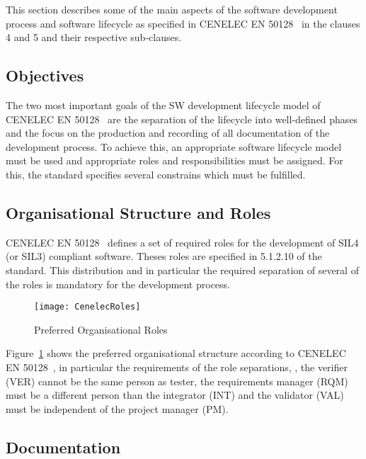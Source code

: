 
This section describes some of the main aspects of the software development
process and software lifecycle as specified in CENELEC EN 50128~\cite{EN-50128}
in the clauses 4 and 5 and their respective sub-clauses.

\subsection{Objectives}
\label{sec:objectives}

The two most important goals of the SW development lifecycle model of CENELEC EN
50128~\cite{EN-50128} are the separation of the lifecycle into well-defined
phases and the focus on the production and recording of all documentation of the
development process. To achieve this, an appropriate software lifecycle model
must be used and appropriate roles and responsibilities must be assigned. For
this, the standard specifies several constrains which must be fulfilled.

\subsection{Organisational Structure and Roles}
\label{sec:organ-struct-roles}

CENELEC EN 50128~\cite{EN-50128} defines a set of required roles for the
development of SIL4 (or SIL3) compliant software. Theses roles are specified in
5.1.2.10 of the standard. This distribution and in particular the required
separation of several of the roles is mandatory for the development process.

\begin{figure}[ht]
  \centering
  \texttt{[image: CenelecRoles]}
  \caption{Preferred Organisational Roles~\cite{EN-50128}}
  \label{fig:preferred-roles}
\end{figure}

Figure~\ref{fig:preferred-roles} shows the preferred organisational structure
according to CENELEC EN 50128~\cite{EN-50128}, in particular the requirements of
the role separations, \eg, the verifier (VER) cannot be the same person as
tester, the requirements manager (RQM) must be a different person than the
integrator (INT) and the validator (VAL) must be independent of the project
manager (PM).

\subsection{Documentation}
\label{sec:documentation}

